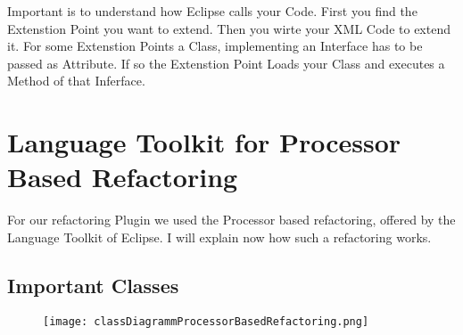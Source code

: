 \documentclass[a4paper,10pt]{report}
\begin{document}
Important is to understand how Eclipse calls your Code. First you find the Extenstion Point you want to extend. Then you wirte your XML Code to extend it. For some Extenstion Points a Class, implementing an Interface has to be passed as Attribute. If so the Extenstion Point Loads your Class and executes a Method of that Inferface.


\chapter{Language Toolkit for Processor Based Refactoring}
For our refactoring Plugin we used the Processor based refactoring, offered by the Language Toolkit of Eclipse. I will explain now how such a refactoring works.
\section{Important Classes}

\begin{figure}[h]
\centering
\texttt{[image: classDiagrammProcessorBasedRefactoring.png]}
\end{figure}
\end{document}

